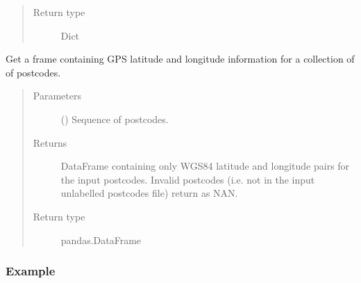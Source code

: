 \documentclass[letterpaper,10pt,english]{sphinxmanual}
\begin{document}
\begin{fulllineitems}
\begin{fulllineitems}
\begin{quote}
\begin{description}
\item[{Return type}] \leavevmode
\sphinxAtStartPar
Dict

\end{description}\end{quote}

\end{fulllineitems}


\begin{fulllineitems}
\label{\detokenize{index:flood_tool.Tool.get_lat_long}}
\sphinxAtStartPar
Get a frame containing GPS latitude and longitude information for a
collection of of postcodes.
\begin{quote}\begin{description}
\item[{Parameters}] \leavevmode
\sphinxAtStartPar
{} () \textendash{} Sequence of postcodes.

\item[{Returns}] \leavevmode
\sphinxAtStartPar
DataFrame containing only WGS84 latitude and longitude pairs for
the input postcodes. Invalid postcodes (i.e. not in the
input unlabelled postcodes file) return as NAN.

\item[{Return type}] \leavevmode
\sphinxAtStartPar
pandas.DataFrame

\end{description}\end{quote}
\subsubsection*{Example}

\begin{sphinxVerbatim}[commandchars=\\\{\}]
\PYG{p}{[} \PYG{p}{]}
\end{sphinxVerbatim}


\end{fulllineitems}
\end{fulllineitems}
\end{document}
